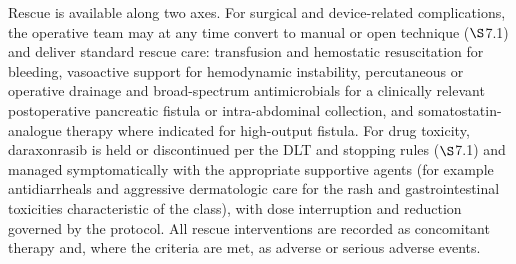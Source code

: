 Rescue is available along two axes. For surgical and device-related complications,
the operative team may at any time convert to manual or open technique ($\S$7.1) and
deliver standard rescue care: transfusion and hemostatic resuscitation for bleeding,
vasoactive support for hemodynamic instability, percutaneous or operative drainage
and broad-spectrum antimicrobials for a clinically relevant postoperative
pancreatic fistula or intra-abdominal collection, and somatostatin-analogue therapy
where indicated for high-output fistula. For drug toxicity, daraxonrasib is held or
discontinued per the DLT and stopping rules ($\S$7.1) and managed symptomatically
with the appropriate supportive agents (for example antidiarrheals and aggressive
dermatologic care for the rash and gastrointestinal toxicities characteristic of
the class), with dose interruption and reduction governed by the protocol. All
rescue interventions are recorded as concomitant therapy and, where the criteria are
met, as adverse or serious adverse events.
